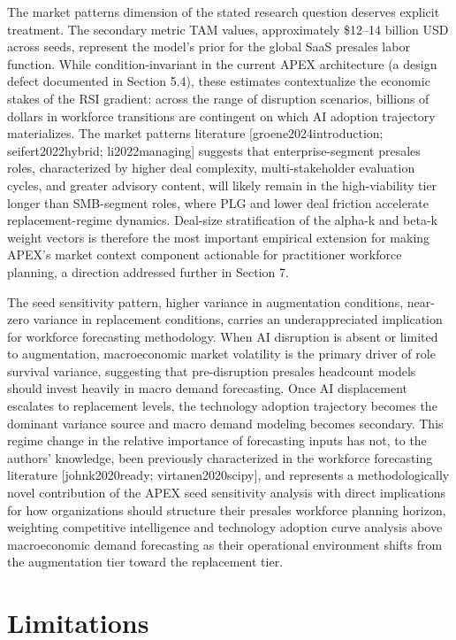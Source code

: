 \documentclass[10pt, conference]{IEEEtran}
\begin{document}
The market patterns dimension of the stated research question deserves explicit treatment. The secondary metric TAM values, approximately \$12--14 billion USD across seeds, represent the model's prior for the global SaaS presales labor function. While condition-invariant in the current APEX architecture (a design defect documented in Section 5.4), these estimates contextualize the economic stakes of the RSI gradient: across the range of disruption scenarios, billions of dollars in workforce transitions are contingent on which AI adoption trajectory materializes. The market patterns literature [groene2024introduction; seifert2022hybrid; li2022managing] suggests that enterprise-segment presales roles, characterized by higher deal complexity, multi-stakeholder evaluation cycles, and greater advisory content, will likely remain in the high-viability tier longer than SMB-segment roles, where PLG and lower deal friction accelerate replacement-regime dynamics. Deal-size stratification of the alpha-k and beta-k weight vectors is therefore the most important empirical extension for making APEX's market context component actionable for practitioner workforce planning, a direction addressed further in Section 7.

The seed sensitivity pattern, higher variance in augmentation conditions, near-zero variance in replacement conditions, carries an underappreciated implication for workforce forecasting methodology. When AI disruption is absent or limited to augmentation, macroeconomic market volatility is the primary driver of role survival variance, suggesting that pre-disruption presales headcount models should invest heavily in macro demand forecasting. Once AI displacement escalates to replacement levels, the technology adoption trajectory becomes the dominant variance source and macro demand modeling becomes secondary. This regime change in the relative importance of forecasting inputs has not, to the authors' knowledge, been previously characterized in the workforce forecasting literature [johnk2020ready; virtanen2020scipy], and represents a methodologically novel contribution of the APEX seed sensitivity analysis with direct implications for how organizations should structure their presales workforce planning horizon, weighting competitive intelligence and technology adoption curve analysis above macroeconomic demand forecasting as their operational environment shifts from the augmentation tier toward the replacement tier.

\section{Limitations}
\end{document}
